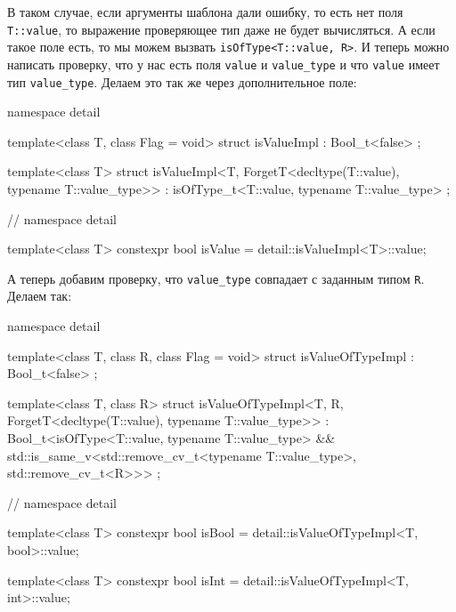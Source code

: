 В таком случае, если аргументы шаблона дали ошибку, то есть нет поля \verb"T::value", то выражение проверяющее тип даже не будет вычисляться.
А если такое поле есть, то мы можем вызвать \verb"isOfType<T::value, R>".
И теперь можно написать проверку, что у нас есть поля \verb"value" и \verb"value_type" и что \verb"value" имеет тип \verb"value_type".
Делаем это так же через дополнительное поле:
\begin{cppcode}
namespace detail {
template<class T, class Flag = void>
struct isValueImpl : Bool_t<false> {};

template<class T>
struct isValueImpl<T, ForgetT<decltype(T::value), typename T::value_type>>
    : isOfType_t<T::value, typename T::value_type> {};
} // namespace detail

template<class T>
constexpr bool isValue = detail::isValueImpl<T>::value;
\end{cppcode}
А теперь добавим проверку, что \verb"value_type" совпадает с заданным типом \verb"R".
Делаем так:
\begin{cppcode}
namespace detail {
template<class T, class R, class Flag = void>
struct isValueOfTypeImpl : Bool_t<false> {};

template<class T, class R>
struct isValueOfTypeImpl<T, R,
                         ForgetT<decltype(T::value), typename T::value_type>>
    : Bool_t<isOfType<T::value, typename T::value_type> &&
             std::is_same_v<std::remove_cv_t<typename T::value_type>,
                            std::remove_cv_t<R>>> {};
} // namespace detail

template<class T>
constexpr bool isBool = detail::isValueOfTypeImpl<T, bool>::value;

template<class T>
constexpr bool isInt = detail::isValueOfTypeImpl<T, int>::value;
\end{cppcode}

